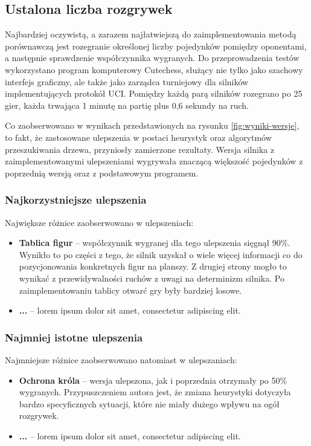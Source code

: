 \subsection{Ustalona liczba rozgrywek}
\label{subsec:ustalona-liczba-rozgrywek}

Najbardziej oczywistą, a zarazem najłatwiejszą do zaimplementowania metodą porównawczą jest rozegranie określonej liczby pojedynków pomiędzy oponentami, a następnie sprawdzenie współczynnika wygranych.
Do przeprowadzenia testów wykorzystano program komputerowy Cutechess, służący nie tylko jako szachowy interfejs graficzny, ale także jako zarządca turniejowy dla silników implementujących protokół UCI.
Pomiędzy każdą parą silników rozegrano po 25 gier, każda trwająca 1 minutę na partię plus 0,6 sekundy na ruch.

Co zaobserwowano w wynikach przedstawionych na rysunku \ref{fig:wyniki-wersje}, to fakt, że zastosowane ulepszenia w postaci heurystyk oraz algorytmów przeszukiwania drzewa, przyniosły zamierzone rezultaty.
Wersja silnika z zaimplementowanymi ulepszeniami wygrywała znaczącą większość pojedynków z poprzednią wersją oraz z podstawowym programem.

\subsubsection{Najkorzystniejsze ulepszenia}

Największe różnice zaobserwowano w ulepszeniach:
\begin{itemize}
    \item \textbf{Tablica figur} – współczynnik wygranej dla tego ulepszenia sięgnął 90\%.
    Wynikło to po części z tego, że silnik uzyskał o wiele więcej informacji co do pozycjonowania konkretnych figur na planszy.
    Z drugiej strony mogło to wynikać z przewidywalności ruchów z uwagi na determinizm silnika.
    Po zaimplementowaniu tablicy otwarć gry były bardziej losowe.
    \item \textbf{...} – lorem ipsum dolor sit amet, consectetur adipiscing elit.
\end{itemize}

\subsubsection{Najmniej istotne ulepszenia}
Najmniejsze różnice zaobserwowano natomiast w ulepszaniach:
\begin{itemize}
    \item \textbf{Ochrona króla} – wersja ulepszona, jak i poprzednia otrzymały po 50\% wygranych.
    Przypuszczeniem autora jest, że zmiana heurystyki dotyczyła bardzo specyficznych sytuacji, które nie miały dużego wpływu na ogół rozgrywek.
    \item \textbf{...} – lorem ipsum dolor sit amet, consectetur adipiscing elit.
\end{itemize}

